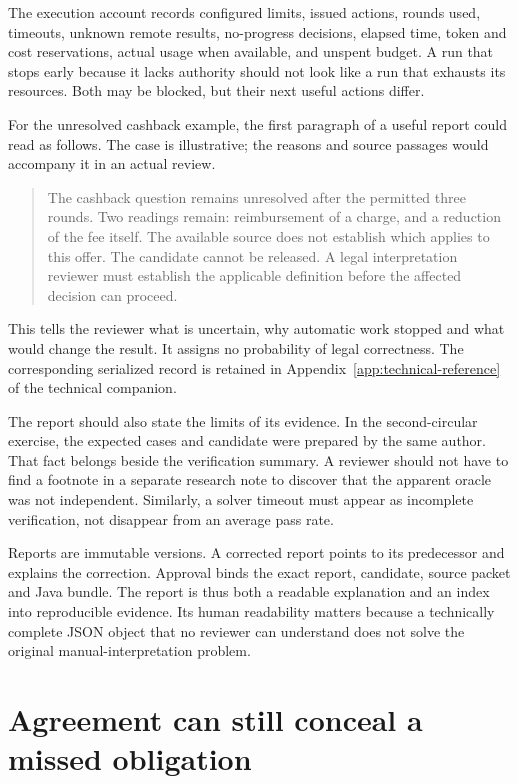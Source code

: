 \documentclass[12pt,a4paper,oneside,openany]{book}
\begin{document}
The execution account records configured limits, issued actions, rounds used,
timeouts, unknown remote results, no-progress decisions, elapsed time, token and
cost reservations, actual usage when available, and unspent budget. A run that
stops early because it lacks authority should not look like a run that exhausts
its resources. Both may be blocked, but their next useful actions differ.

For the unresolved cashback example, the first paragraph of a useful report
could read as follows. The case is illustrative; the reasons and source passages
would accompany it in an actual review.

\begin{quote}
The cashback question remains unresolved after the permitted three rounds.
Two readings remain: reimbursement of a charge, and a reduction of the fee
itself. The available source does not establish which applies to this offer.
The candidate cannot be released. A legal interpretation reviewer must establish
the applicable definition before the affected decision can proceed.
\end{quote}

This tells the reviewer what is uncertain, why automatic work stopped and what
would change the result. It assigns no probability of legal correctness.
The corresponding serialized record is retained in
Appendix~\ref{app:technical-reference} of the technical companion.


The report should also state the limits of its evidence. In the second-circular
exercise, the expected cases and candidate were prepared by the same author.
That fact belongs beside the verification summary. A reviewer should not have to
find a footnote in a separate research note to discover that the apparent oracle
was not independent. Similarly, a solver timeout must appear as incomplete
verification, not disappear from an average pass rate.

Reports are immutable versions. A corrected report points to its predecessor and
explains the correction. Approval binds the exact report, candidate, source
packet and Java bundle. The report is thus both a readable explanation and an
index into reproducible evidence. Its human readability matters because a
technically complete JSON object that no reviewer can understand does not solve
the original manual-interpretation problem.

\section{Agreement can still conceal a missed obligation}
\label{merge:M06:23}
\end{document}
